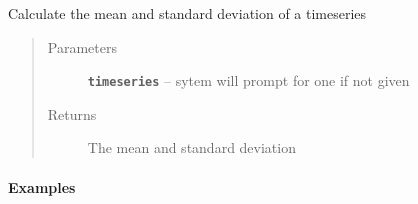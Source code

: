 \documentclass[letterpaper,10pt,english]{sphinxmanual}
\begin{document}
\begin{fulllineitems}
\label{Main:pyleoclim.TSstats}
Calculate the mean and standard deviation of a timeseries
\begin{quote}\begin{description}
\item[{Parameters}] \leavevmode
\textbf{\texttt{timeseries}} -- sytem will prompt for one if not given

\item[{Returns}] \leavevmode
The mean and standard deviation

\end{description}\end{quote}
\paragraph{Examples}


\end{fulllineitems}
\end{document}
